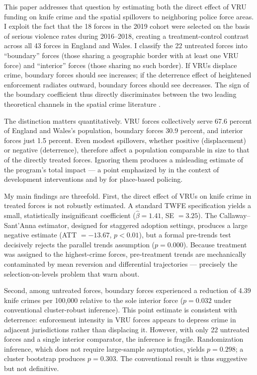 \documentclass[12pt]{article}
\begin{document}
This paper addresses that question by estimating both the direct effect of VRU funding on knife crime and the spatial spillovers to neighboring police force areas. I exploit the fact that the 18 forces in the 2019 cohort were selected on the basis of serious violence rates during 2016--2018, creating a treatment-control contrast across all 43 forces in England and Wales. I classify the 22 untreated forces into ``boundary'' forces (those sharing a geographic border with at least one VRU force) and ``interior'' forces (those sharing no such border). If VRUs displace crime, boundary forces should see increases; if the deterrence effect of heightened enforcement radiates outward, boundary forces should see decreases. The sign of the boundary coefficient thus directly discriminates between the two leading theoretical channels in the spatial crime literature \citep{guerette2009displacement, johnson2014displacement, weisburd2006displacement}.

The distinction matters quantitatively. VRU forces collectively serve 67.6 percent of England and Wales's population, boundary forces 30.9 percent, and interior forces just 1.5 percent. Even modest spillovers, whether positive (displacement) or negative (deterrence), therefore affect a population comparable in size to that of the directly treated forces. Ignoring them produces a misleading estimate of the program's total impact --- a point emphasized by \citet{angelucci2015microcredit} in the context of development interventions and by \citet{blattman2021place} for place-based policing.

My main findings are threefold. First, the direct effect of VRUs on knife crime in treated forces is not robustly estimated. A standard TWFE specification yields a small, statistically insignificant coefficient ($\hat\beta = 1.41$, SE $= 3.25$). The Callaway--Sant'Anna estimator, designed for staggered adoption settings, produces a large negative estimate (ATT $= -13.67$, $p < 0.01$), but a formal pre-trends test decisively rejects the parallel trends assumption ($p = 0.000$). Because treatment was assigned to the highest-crime forces, pre-treatment trends are mechanically contaminated by mean reversion and differential trajectories --- precisely the selection-on-levels problem that \citet{roth2023pretrends} warn about.

Second, among untreated forces, boundary forces experienced a reduction of 4.39 knife crimes per 100,000 relative to the sole interior force ($p = 0.032$ under conventional cluster-robust inference). This point estimate is consistent with deterrence: enforcement intensity in VRU forces appears to depress crime in adjacent jurisdictions rather than displacing it. However, with only 22 untreated forces and a single interior comparator, the inference is fragile. Randomization inference, which does not require large-sample asymptotics, yields $p = 0.298$; a cluster bootstrap produces $p = 0.303$. The conventional result is thus suggestive but not definitive.
\end{document}
